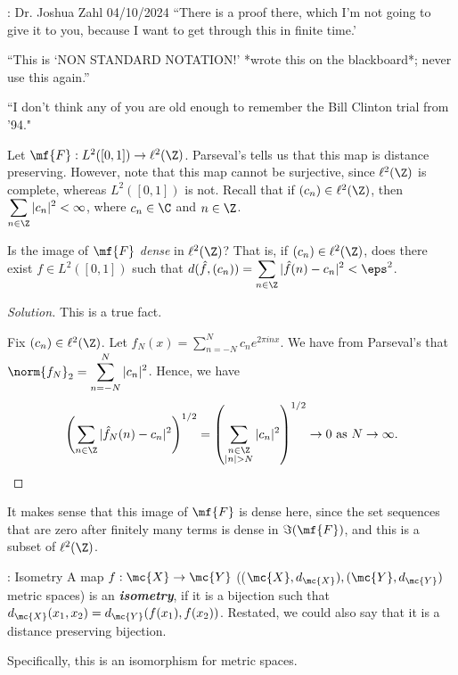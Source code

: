 \begin{nquote}{: Dr. Joshua Zahl 04/10/2024}
    ``There is a proof there, which I'm not going to give it to you, because I want to get through this in finite time.'

    \medskip

    ``This is `NON STANDARD NOTATION!' *wrote this on the blackboard*; never use this again.''

    \medskip

    ``I don't think any of you are old enough to remember the Bill Clinton trial from '94."
\end{nquote}

Let \(\mf{F}:L^2([0,1])\to\ell^2(\Z)\). Parseval's tells us that this map is distance preserving. However, note that this map cannot be surjective, since \(\ell^2(\Z)\) is complete, whereas \(L^2([0,1])\) is not. Recall that if \((c_n)\in\ell^2(\Z)\), then \(\displaystyle\sum_{n\in\Z}|c_n|^2<\infty\), where \(c_n\in\C\) and \(n\in\Z\).
\begin{fft}
    Is the image of \(\mf{F}\) \emph{dense} in \(\ell^2(\Z)\)? That is, if \((c_n)\in\ell^2(\Z)\), does there exist \(f\in L^2([0,1])\) such that \(d(\hat{f},(c_n))=\displaystyle\sum_{n\in\Z}|\hat{f}(n)-c_n|^2<\eps^2\).
\end{fft}
\begin{proof}[Solution]
    This is a true fact.

    \medskip

    Fix \((c_n)\in\ell^2(\Z)\). Let \(f_N(x)=\displaystyle\sum_{n=-N}^N c_n e^{2\pi inx}\). We have from Parseval's that \(\norm{f_N}_2=\displaystyle\sum_{n=-N}^N |c_n|^2\). Hence, we have 
    \begin{equation*} 
        \left(\sum_{n\in\Z}|\hat{f}_N(n)-c_n|^2\right)^{1/2}=\left(\sum_{\substack{n\in\Z \\ |n|>N}}|c_n|^2\right)^{1/2}\to 0~\text{as}~N\to\infty.
    \end{equation*}
\end{proof}
\begin{note}
    It makes sense that this image of \(\mf{F}\) is dense here, since the set sequences that are zero after finitely many terms is dense in \(\Im(\mf{F})\), and this is a subset of \(\ell^2(\Z)\).
\end{note}
\begin{ndef}{: Isometry}
    A map \(f:\mc{X}\to\mc{Y}\) ((\(\mc{X},d_{\mc{X}}),(\mc{Y},d_{\mc{Y}})\) metric spaces) is an \emph{\textbf{isometry}}, if it is a bijection such that \(d_{\mc{X}}(x_1,x_2)=d_{\mc{Y}}(f(x_1),f(x_2))\). Restated, we could also say that it is a distance preserving bijection. 

    \medskip

    Specifically, this is an isomorphism for metric spaces.
\end{ndef}


